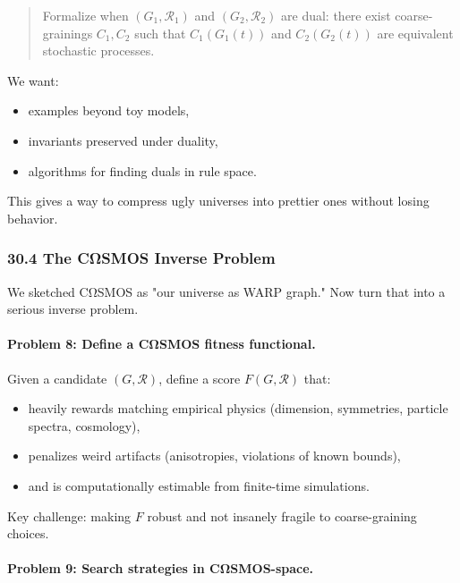 \begin{quote}
Formalize when $(G_1,\mathcal{R}_1)$ and $(G_2,\mathcal{R}_2)$ are dual: there exist coarse-grainings $C_1, C_2$ such that $C_1(G_1(t))$ and $C_2(G_2(t))$ are equivalent stochastic processes.
\end{quote}

We want:

\begin{itemize}
  \item examples beyond toy models,
  \item invariants preserved under duality,
  \item algorithms for finding duals in rule space.
\end{itemize}

This gives a way to compress ugly universes into prettier ones without losing behavior.

\subsubsection*{30.4  The CΩSMOS Inverse Problem}

We sketched CΩSMOS as "our universe as WARP graph." Now turn that into a serious inverse problem.

\paragraph{Problem 8: Define a CΩSMOS fitness functional.}

Given a candidate $(G,\mathcal{R})$, define a score $F(G,\mathcal{R})$ that:

\begin{itemize}
  \item heavily rewards matching empirical physics (dimension, symmetries, particle spectra, cosmology),
  \item penalizes weird artifacts (anisotropies, violations of known bounds),
  \item and is computationally estimable from finite-time simulations.
\end{itemize}

Key challenge: making $F$ robust and not insanely fragile to coarse-graining choices.

\paragraph{Problem 9: Search strategies in CΩSMOS-space.}

